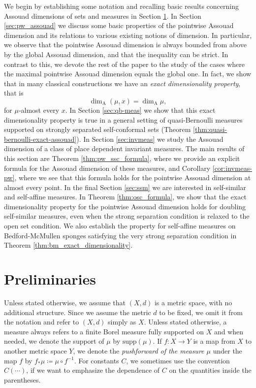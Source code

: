 \documentclass{PRM}
\newcommand{\adim}{\dim_{\mathrm{A}}}
\theoremstyle{plain}
\theoremstyle{definition}
\theoremstyle{remark}
\begin{document}
We begin by establishing some notation and recalling basic results concerning Assouad dimensions of sets and measures in Section \ref{sec:prelim}. In Section \ref{sec:pw_assouad} we discuss some basic properties of the pointwise Assouad dimension and its relations to various existing notions of dimension. In particular, we observe that the pointwise Assouad dimension is always bounded from above by the global Assouad dimension, and that the inequality can be strict. In contrast to this, we devote the rest of the paper to the study of the cases where the maximal pointwise Assouad dimension equals the global one.
In fact, we show that in many classical constructions we have an \emph{exact dimensionality property}, that is
\begin{equation*}
    \adim(\mu,x)= \adim\mu,
\end{equation*}
for $\mu$-almost every $x$. In Section \ref{sec:qb-meas} we show that this exact dimensionality property is true in a general setting of quasi-Bernoulli measures supported on strongly separated self-conformal sets (Theorem \ref{thm:quasi-bernoulli-exact-assouad}). In Section \ref{sec:invmeas} we study the Assouad dimension of a class of place dependent invariant measures. The main results of this section are Theorem \ref{thm:pw_ssc_formula}, where we provide an explicit formula for the Assouad dimension of these measures, and Corollary \ref{cor:invmeas-pw}, where we see that this formula holds for the pointwise Assouad dimension at almost every point. In the final Section \ref{sec:ssm} we are interested in self-similar and self-affine measures. In Theorem \ref{thm:osc_formula}, we show that the exact dimensionality property for the pointwise Assouad dimension holds for doubling self-similar measures, even when the strong separation condition is relaxed to the open set condition. We also establish the property for self-affine measures on Bedford-McMullen sponges satisfying the very strong separation condition in Theorem \ref{thm:bm_exact_dimensionality}.

\section{Preliminaries}\label{sec:prelim}
Unless stated otherwise, we assume that $(X,d)$ is a metric space, with no additional structure. Since we assume the metric $d$ to be fixed, we omit it from the notation and refer to $(X,d)$ simply as $X$. Unless stated otherwise, a measure always refers to a finite Borel measure fully supported on $X$ and when needed, we denote the support of $\mu$ by $\mathrm{supp}(\mu)$. If $f:X\to Y$ is a map from $X$ to another metric space $Y$, we denote the \emph{pushforward of the measure $\mu$} under the map $f$ by $f_*\mu\coloneqq\mu\circ f^{-1}$.  For constants $C$, we sometimes use the convention $C(\cdots)$, if we want to emphasize the dependence of $C$ on the quantities inside the parentheses.
\end{document}
